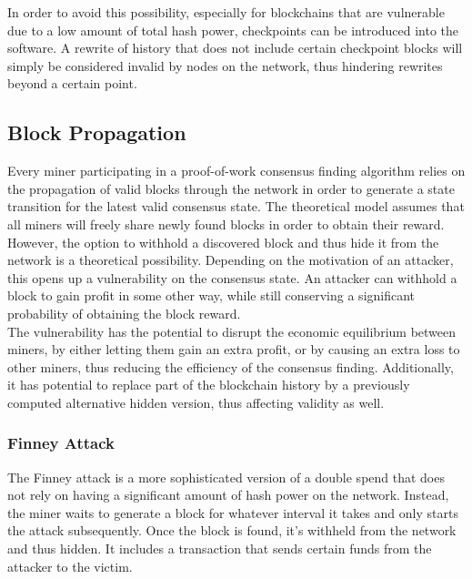 \documentclass[11pt,a4paper,draft]{article}
\begin{document}
In order to avoid this possibility, especially for blockchains that are vulnerable due to a low amount of total hash power, checkpoints can be introduced into the software. A rewrite of history that does not include certain checkpoint blocks will simply be considered invalid by nodes on the network, thus hindering rewrites beyond a certain point.\\


\subsection{Block Propagation}

Every miner participating in a proof-of-work consensus finding algorithm relies on the propagation of valid blocks through the network in order to generate a state transition for the latest valid consensus state. The theoretical model assumes that all miners will freely share newly found blocks in order to obtain their reward.\\

However, the option to withhold a discovered block and thus hide it from the network is a theoretical possibility. Depending on the motivation of an attacker, this opens up a vulnerability on the consensus state. An attacker can withhold a block to gain profit in some other way, while still conserving a significant probability of obtaining the block reward.\\

The vulnerability has the potential to disrupt the economic equilibrium between miners, by either letting them gain an extra profit, or by causing an extra loss to other miners, thus reducing the efficiency of the consensus finding. Additionally, it has potential to replace part of the blockchain history by a previously computed alternative hidden version, thus affecting validity as well.\\

\subsubsection{Finney Attack}

The Finney attack is a more sophisticated version of a double spend that does not rely on having a significant amount of hash power on the network. Instead, the miner waits to generate a block for whatever interval it takes and only starts the attack subsequently. Once the block is found, it's withheld from the network and thus hidden. It includes a transaction that sends certain funds from the attacker to the victim.\\
\end{document}
